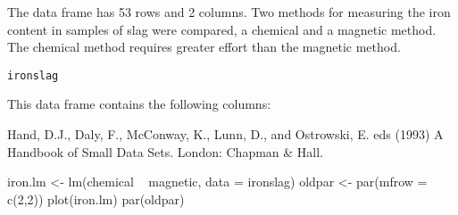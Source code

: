 \begin{Description}\relax
The  data frame has 53 rows and 2 columns.
Two methods for measuring the iron content in samples of slag 
were compared, a chemical and a magnetic method.  The chemical
method requires greater effort than the magnetic method.
\end{Description}
\begin{Usage}
\begin{verbatim}ironslag\end{verbatim}
\end{Usage}
\begin{Format}\relax
This data frame contains the following columns:
\end{Format}
\begin{Source}\relax
Hand, D.J., Daly, F., McConway, K., Lunn, D., and Ostrowski, E. eds (1993)
A Handbook of Small Data Sets. London: Chapman \& Hall.
\end{Source}
\begin{Examples}
\begin{ExampleCode}
iron.lm <- lm(chemical ~ magnetic, data = ironslag)
oldpar <- par(mfrow = c(2,2))
plot(iron.lm)
par(oldpar)
\end{ExampleCode}
\end{Examples}

